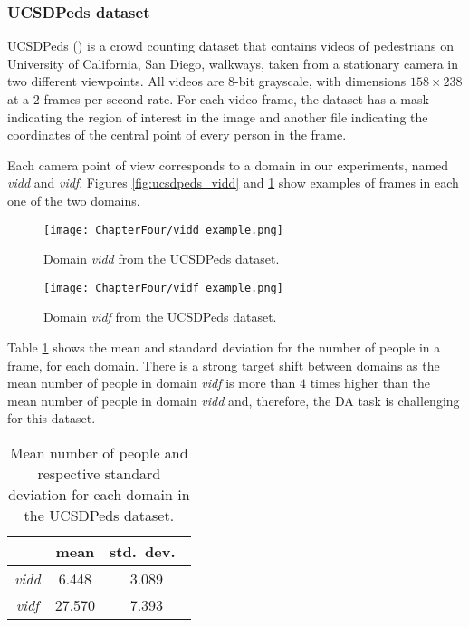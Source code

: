 \subsubsection{UCSDPeds dataset}
\label{sec:da_sensors_ucsdpeds}

UCSDPeds (\citet{Chan2008}) is a crowd counting dataset that contains videos of pedestrians on University of California, San Diego, walkways, taken from a stationary camera in two different viewpoints. All videos are 8-bit grayscale, with dimensions $158 \times 238$ at a $2$ frames per second rate. For each video frame, the dataset has a mask indicating the region of interest in the image and another file indicating the coordinates of the central point of every person in the frame.

Each camera point of view corresponds to a domain in our experiments, named \textit{vidd} and \textit{vidf}. Figures \ref{fig:ucsdpeds_vidd} and \ref{fig:ucsdpeds_vidf} show examples of frames in each one of the two domains.

\begin{figure}[!ht]
    \centering
    \begin{minipage}[b]{0.4\textwidth}
        \texttt{[image: ChapterFour/vidd\_example.png]}
        \caption{Domain \textit{vidd} from the UCSDPeds dataset.}
        \label{fig:ucsdpeds_vidd}
    \end{minipage}
    \hfill
    \begin{minipage}[b]{0.4\textwidth}
        \texttt{[image: ChapterFour/vidf\_example.png]}
        \caption{Domain \textit{vidf} from the UCSDPeds dataset.}
        \label{fig:ucsdpeds_vidf}
    \end{minipage}
\end{figure}

Table \ref{tab:ucsdpeds_domains} shows the mean and standard deviation for the number of people in a frame, for each domain. There is a strong target shift between domains as the mean number of people in domain \textit{vidf} is more than $4$ times higher than the mean number of people in domain \textit{vidd} and, therefore, the DA task is challenging for this dataset.

\begin{table}[!ht]
    \centering
    \begin{tabular}{c| c c}
        & mean & std.\ dev.\  \\
        \hline
        \textit{vidd} & 6.448 & 3.089\\
        \textit{vidf} & 27.570 & 7.393 \\
    \end{tabular}
    \caption{Mean number of people and respective standard deviation for each domain in the UCSDPeds dataset.}
    \label{tab:ucsdpeds_domains}
\end{table}

